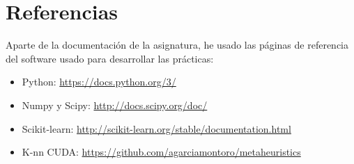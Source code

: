 \section{Referencias}
Aparte de la documentación de la asignatura, he usado las páginas de referencia del software usado para desarrollar las prácticas:
\begin{itemize}
\item Python:  \url{https://docs.python.org/3/}
\item Numpy y Scipy: \url{http://docs.scipy.org/doc/}
\item Scikit-learn: \url{http://scikit-learn.org/stable/documentation.html}
\item K-nn CUDA: \url{https://github.com/agarciamontoro/metaheuristics}
\end{itemize}
